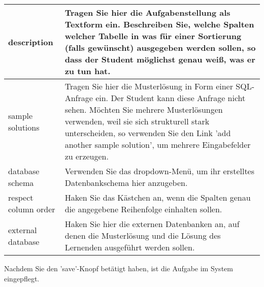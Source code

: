 \documentclass[12pt]{scrreprt}
\theoremstyle{remark}
\begin{document}
\begin{tabular}{|l|p{12cm}|}\hline
description & Tragen Sie hier die Aufgabenstellung als Textform ein. Beschreiben Sie, welche Spalten welcher Tabelle in was für einer Sortierung (falls gewünscht) ausgegeben werden sollen, so dass der Student möglichst genau weiß, was er zu tun hat.\\\hline
sample solutions & Tragen Sie hier die Musterlösung in Form einer SQL-Anfrage ein. Der Student kann diese Anfrage nicht sehen. Möchten Sie mehrere Musterlösungen verwenden, weil sie sich strukturell stark unterscheiden, so verwenden Sie den Link 'add another sample solution', um mehrere Eingabefelder zu erzeugen.\\\hline
database schema & Verwenden Sie das dropdown-Menü, um ihr erstelltes Datenbankschema hier anzugeben.\\\hline
respect column order & Haken Sie das Kästchen an, wenn die Spalten genau die angegebene Reihenfolge einhalten sollen.\\\hline
external database & Haken Sie hier die externen Datenbanken an, auf denen die Musterlösung und die Lösung des Lernenden ausgeführt werden sollen.\\\hline
\end{tabular}

Nachdem Sie den 'save'-Knopf betätigt haben, ist die Aufgabe im System eingepflegt.



\end{document}
